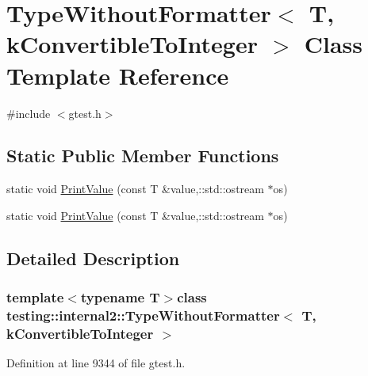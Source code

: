 \hypertarget{classtesting_1_1internal2_1_1TypeWithoutFormatter_3_01T_00_01kConvertibleToInteger_01_4}{\section{\-Type\-Without\-Formatter$<$ \-T, k\-Convertible\-To\-Integer $>$ \-Class \-Template \-Reference}
\label{d3/d05/classtesting_1_1internal2_1_1TypeWithoutFormatter_3_01T_00_01kConvertibleToInteger_01_4}
}


{\ttfamily \#include $<$gtest.\-h$>$}

\subsection*{\-Static \-Public \-Member \-Functions}
\begin{DoxyCompactItemize}
\item 
static void \hyperlink{classtesting_1_1internal2_1_1TypeWithoutFormatter_3_01T_00_01kConvertibleToInteger_01_4_a3ac7770f918210bb197165f28880c544}{\-Print\-Value} (const \-T \&value,\-::std\-::ostream $\ast$os)
\item 
static void \hyperlink{classtesting_1_1internal2_1_1TypeWithoutFormatter_3_01T_00_01kConvertibleToInteger_01_4_a3ac7770f918210bb197165f28880c544}{\-Print\-Value} (const \-T \&value,\-::std\-::ostream $\ast$os)
\end{DoxyCompactItemize}


\subsection{\-Detailed \-Description}
\subsubsection*{template$<$typename T$>$class testing\-::internal2\-::\-Type\-Without\-Formatter$<$ T, k\-Convertible\-To\-Integer $>$}



\-Definition at line 9344 of file gtest.\-h.



